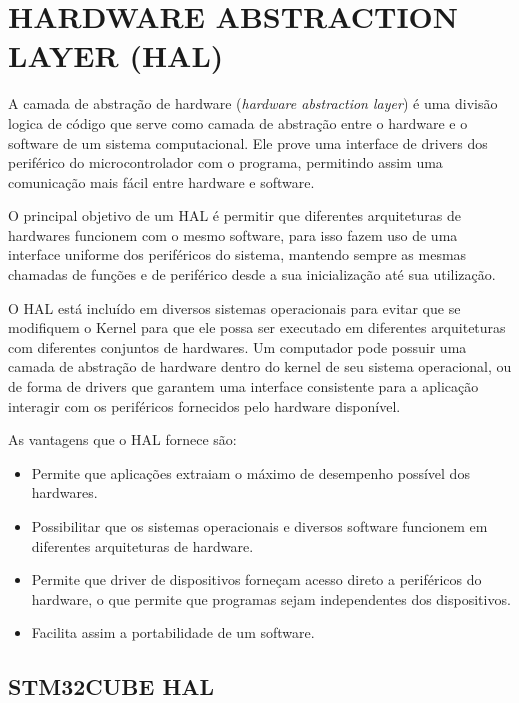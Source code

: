 

\section{HARDWARE ABSTRACTION LAYER (HAL)}
A camada de abstração de hardware (\textit{hardware abstraction layer}) é uma divisão logica de código que serve como camada de abstração entre o hardware e o software de um sistema computacional. Ele prove uma interface de drivers dos periférico do microcontrolador com o programa, permitindo assim uma comunicação mais fácil entre hardware e software.

O principal objetivo de um HAL é permitir que diferentes arquiteturas de hardwares funcionem com o mesmo software, para isso fazem uso de uma interface uniforme dos periféricos do sistema, mantendo sempre as mesmas chamadas de funções e de periférico desde a sua inicialização até sua utilização.

O HAL está incluído em diversos sistemas operacionais para evitar que se modifiquem o Kernel para que ele possa ser executado em diferentes arquiteturas com diferentes conjuntos de hardwares. Um computador pode possuir uma camada de abstração de hardware dentro do kernel de seu sistema operacional, ou de forma de drivers que garantem uma interface consistente para a aplicação interagir com os periféricos fornecidos pelo hardware disponível.

As vantagens que o HAL fornece são:
\begin{itemize}
    \item Permite que aplicações extraiam o máximo de desempenho possível dos hardwares.
    \item Possibilitar que os sistemas operacionais e diversos software funcionem em diferentes arquiteturas de hardware.
    \item Permite que driver de dispositivos forneçam acesso direto a periféricos do hardware, o que permite que programas sejam independentes dos dispositivos.
    \item Facilita assim a portabilidade de um software.
\end{itemize}

\subsection{STM32CUBE HAL} 

